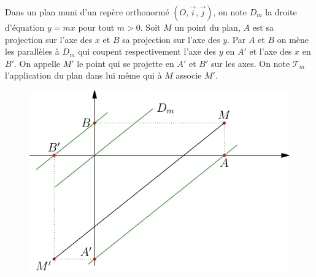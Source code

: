 Dans un plan muni d'un rep{\`e}re orthonorm{\'e} $(O,\overrightarrow{i},\overrightarrow{j})$, on note $D_m$ la droite d'{\'e}quation $y=mx$ pour tout $m>0$.\newline
Soit $M$ un point du plan, $A$ est sa projection sur l'axe des $x$ et $B$ sa projection sur l'axe des $y$. Par $A$ et $B$ on m{\`e}ne les parall{\`e}les {\`a} $D_m$ qui coupent respectivement l'axe des $y$ en $A'$ et l'axe des $x$ en $B'$.\newline
On appelle $M'$ le point qui se projette en $A'$ et $B'$ sur les axes. On note $\mathcal{T}_m$ l'application du plan dans lui m{\^e}me qui {\`a} $M$ associe $M'$.
\begin{figure}[!h]
 \centering
 \includegraphics{Egep1_1.pdf}
\end{figure}

